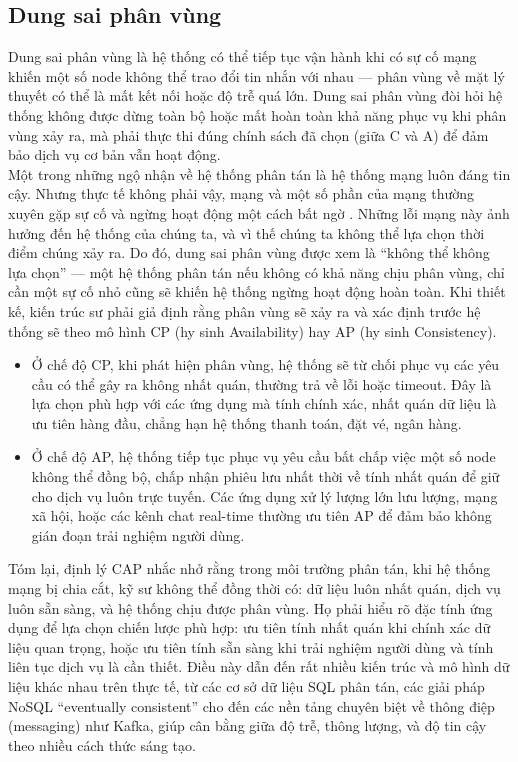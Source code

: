 \documentclass[conference]{IEEEtran}
\begin{document}
\subsection{Dung sai phân vùng}
Dung sai phân vùng là hệ thống có thể tiếp tục vận hành khi có sự cố mạng khiến một số node không thể trao đổi tin nhắn với nhau — phân vùng về mặt lý thuyết có thể là mất kết nối hoặc độ trễ quá lớn. Dung sai phân vùng đòi hỏi hệ thống không được dừng toàn bộ hoặc mất hoàn toàn khả năng phục vụ khi phân vùng xảy ra, mà phải thực thi đúng chính sách đã chọn (giữa C và A) để đảm bảo dịch vụ cơ bản vẫn hoạt động.\\
Một trong những ngộ nhận về hệ thống phân tán là hệ thống mạng luôn đáng tin cậy. Nhưng thực tế không phải vậy, mạng và một số phần của mạng thường xuyên gặp sự cố và ngừng hoạt động một cách bất ngờ \cite{rotem}. Những lỗi mạng này ảnh hưởng đến hệ thống của chúng ta, và vì thế chúng ta không thể lựa chọn thời điểm chúng xảy ra. Do đó, dung sai phân vùng được xem là “không thể không lựa chọn” — một hệ thống phân tán nếu không có khả năng chịu phân vùng, chỉ cần một sự cố nhỏ cũng sẽ khiến hệ thống ngừng hoạt động hoàn toàn. Khi thiết kế, kiến trúc sư phải giả định rằng phân vùng sẽ xảy ra và xác định trước hệ thống sẽ theo mô hình CP (hy sinh Availability) hay AP (hy sinh Consistency).
\begin{itemize}
    \item Ở chế độ CP, khi phát hiện phân vùng, hệ thống sẽ từ chối phục vụ các yêu cầu có thể gây ra không nhất quán, thường trả về lỗi hoặc timeout. Đây là lựa chọn phù hợp với các ứng dụng mà tính chính xác, nhất quán dữ liệu là ưu tiên hàng đầu, chẳng hạn hệ thống thanh toán, đặt vé, ngân hàng.
    \item Ở chế độ AP, hệ thống tiếp tục phục vụ yêu cầu bất chấp việc một số node không thể đồng bộ, chấp nhận phiêu lưu nhất thời về tính nhất quán để giữ cho dịch vụ luôn trực tuyến. Các ứng dụng xử lý lượng lớn lưu lượng, mạng xã hội, hoặc các kênh chat real-time thường ưu tiên AP để đảm bảo không gián đoạn trải nghiệm người dùng.
\end{itemize}
Tóm lại, định lý CAP nhắc nhở rằng trong môi trường phân tán, khi hệ thống mạng bị chia cắt, kỹ sư không thể đồng thời có: dữ liệu luôn nhất quán, dịch vụ luôn sẵn sàng, và hệ thống chịu được phân vùng. Họ phải hiểu rõ đặc tính ứng dụng để lựa chọn chiến lược phù hợp: ưu tiên tính nhất quán khi chính xác dữ liệu quan trọng, hoặc ưu tiên tính sẵn sàng khi trải nghiệm người dùng và tính liên tục dịch vụ là cần thiết. Điều này dẫn đến rất nhiều kiến trúc và mô hình dữ liệu khác nhau trên thực tế, từ các cơ sở dữ liệu SQL phân tán, các giải pháp NoSQL “eventually consistent” cho đến các nền tảng chuyên biệt về thông điệp (messaging) như Kafka, giúp cân bằng giữa độ trễ, thông lượng, và độ tin cậy theo nhiều cách thức sáng tạo.
\end{document}
